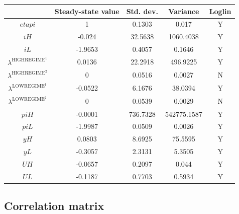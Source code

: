 \begin{tabular}{c|c|c|c|c|}
  & Steady-state value & Std. dev. & Variance & Loglin\\
\hline
${e\!t\!a\!p\!i}$ & 1 & 0.1303 & 0.017 & Y    \\
${i\!H}$ & -0.024 & 32.5638 & 1060.4038 & Y    \\
${i\!L}$ & -1.9653 & 0.4057 & 0.1646 & Y    \\
$\lambda^{\mathrm{HIGHREGIME}^{\mathrm{1}}}$ & 0.0136 & 22.2918 & 496.9225 & Y    \\
$\lambda^{\mathrm{HIGHREGIME}^{\mathrm{2}}}$ & 0 & 0.0516 & 0.0027 & N    \\
$\lambda^{\mathrm{LOWREGIME}^{\mathrm{1}}}$ & -0.0522 & 6.1676 & 38.0394 & Y    \\
$\lambda^{\mathrm{LOWREGIME}^{\mathrm{2}}}$ & 0 & 0.0539 & 0.0029 & N    \\
${p\!i\!H}$ & -0.0001 & 736.7328 & 542775.1587 & Y    \\
${p\!i\!L}$ & -1.9987 & 0.0509 & 0.0026 & Y    \\
${y\!H}$ & 0.0803 & 8.6925 & 75.5595 & Y    \\
${y\!L}$ & -0.3057 & 2.3131 & 5.3505 & Y    \\
${U\!H}$ & -0.0657 & 0.2097 & 0.044 & Y    \\
${U\!L}$ & -0.1187 & 0.7703 & 0.5934 & Y    \\
\hline
\end{tabular}


\subsection{Correlation matrix}

